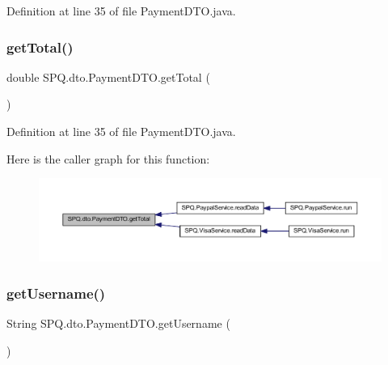Definition at line 35 of file Payment\+D\+T\+O.\+java.

\mbox{\label{class_s_p_q_1_1dto_1_1_payment_d_t_o_a04cd2104d07971407126fcf75ef17d5b}} 
\subsubsection{\texorpdfstring{get\+Total()}{getTotal()}\hspace{0.1cm}{\footnotesize\ttfamily [3/3]}}
{\footnotesize\ttfamily double S\+P\+Q.\+dto.\+Payment\+D\+T\+O.\+get\+Total (\begin{DoxyParamCaption}{ }\end{DoxyParamCaption})}



Definition at line 35 of file Payment\+D\+T\+O.\+java.

Here is the caller graph for this function\+:
\nopagebreak
\begin{figure}[H]
\begin{center}
\leavevmode
\includegraphics[width=350pt]{class_s_p_q_1_1dto_1_1_payment_d_t_o_a04cd2104d07971407126fcf75ef17d5b_icgraph}
\end{center}
\end{figure}
\mbox{\label{class_s_p_q_1_1dto_1_1_payment_d_t_o_a31d0edbb3ec64b406e70cd3deaa5ab1a}} 
\subsubsection{\texorpdfstring{get\+Username()}{getUsername()}\hspace{0.1cm}{\footnotesize\ttfamily [1/3]}}
{\footnotesize\ttfamily String S\+P\+Q.\+dto.\+Payment\+D\+T\+O.\+get\+Username (\begin{DoxyParamCaption}{ }\end{DoxyParamCaption})}



